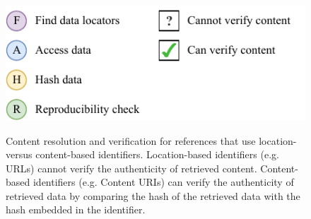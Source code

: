 \begin{figure}[ht] %


\centering
{} \\
 \\
\includegraphics[scale=.9]{figures/fig4legend.pdf}%

\caption{Content resolution and verification for references that use location- versus content-based identifiers.  Location-based identifiers (e.g. URLs) cannot verify the authenticity of retrieved content.  Content-based identifiers (e.g. Content URIs) can verify the authenticity of retrieved data by comparing the hash of the retrieved data with the hash embedded in the identifier.
}%

\label{fig:verification} %

\end{figure}
